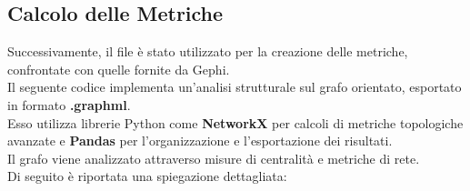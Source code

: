 \documentclass[12pt]{article}
\begin{document}
	\subsection{Calcolo delle Metriche}
	Successivamente, il file è stato utilizzato per la creazione delle metriche, confrontate con quelle fornite da Gephi.\\
	Il seguente codice implementa un’analisi strutturale sul grafo orientato, esportato in formato \textbf{.graphml}. \\Esso utilizza librerie Python come \textbf{NetworkX} per calcoli di metriche topologiche avanzate e \textbf{Pandas} per l’organizzazione e l’esportazione dei risultati. \\ Il grafo viene analizzato attraverso misure di centralità e metriche di rete. \\Di seguito è riportata una spiegazione dettagliata:
\end{document}

